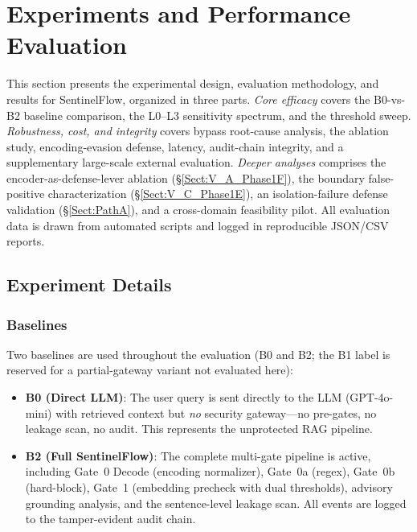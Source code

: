\documentclass[journal]{IEEEtran}
\begin{document}
\section{Experiments and Performance Evaluation}
\label{Sect:Experimental_Procedure_Performance_Evaluation}
This section presents the experimental design, evaluation methodology, and results for SentinelFlow, organized in three parts. \emph{Core efficacy} covers the B0-vs-B2 baseline comparison, the L0--L3 sensitivity spectrum, and the threshold sweep. \emph{Robustness, cost, and integrity} covers bypass root-cause analysis, the ablation study, encoding-evasion defense, latency, audit-chain integrity, and a supplementary large-scale external evaluation. \emph{Deeper analyses} comprises the encoder-as-defense-lever ablation (\S\ref{Sect:V_A_Phase1F}), the boundary false-positive characterization (\S\ref{Sect:V_C_Phase1E}), an isolation-failure defense validation (\S\ref{Sect:PathA}), and a cross-domain feasibility pilot. All evaluation data is drawn from automated scripts and logged in reproducible JSON/CSV reports.

\subsection{Experiment Details}
\label{Sect:Experiment_Details}

\subsubsection{Baselines}

Two baselines are used throughout the evaluation (B0 and B2; the B1 label is reserved for a partial-gateway variant not evaluated here):

\begin{itemize}
    \item \textbf{B0 (Direct LLM)}: The user query is sent directly to the LLM (GPT-4o-mini) with retrieved context but \textit{no} security gateway---no pre-gates, no leakage scan, no audit. This represents the unprotected RAG pipeline.
    \item \textbf{B2 (Full SentinelFlow)}: The complete multi-gate pipeline is active, including Gate~0 Decode (encoding normalizer), Gate~0a (regex), Gate~0b (hard-block), Gate~1 (embedding precheck with dual thresholds), advisory grounding analysis, and the sentence-level leakage scan. All events are logged to the tamper-evident audit chain.
\end{itemize}
\end{document}
